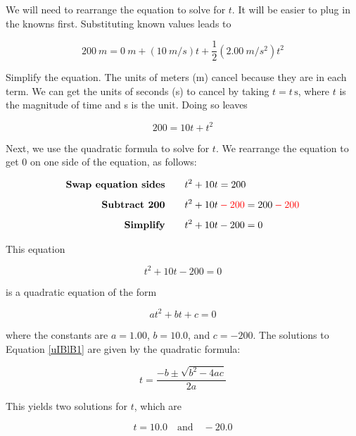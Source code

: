 \documentclass[main-ap-physics.tex]{subfiles}
\begin{document}
\vspace{1em}

We will need to rearrange the equation to solve for $t$. It will be easier to plug in the knowns first. Substituting known values leads to 

\begin{equation*}
    \SI{200}{m} = \SI{0}{m} + \left(\SI{10}{m/s}\right) t + \frac{1}{2}\left(\SI{2.00}{m/s^2}\right) t^2
\end{equation*}

Simplify the equation. The units of meters (m) cancel because they are in each term. We can get the units of seconds (s) to cancel by taking  $t = t\,\text{s}$, where $t$ is the magnitude of time and s is the unit. Doing so leaves

\begin{equation*}
    200 = 10t + t^2
\end{equation*}

Next, we use the quadratic formula to solve for $t$. We rearrange the equation to get 0 on one side of the equation, as follows:

\begin{align*}
    \textbf{Swap equation sides} \qquad & t^2 + 10t = 200\\[1ex]
    \textbf{Subtract 200} \qquad & t^2 + 10t \mathbin{\color{red} -} \textcolor{red}{200} = 200 \mathbin{\color{red} -} \textcolor{red}{200}\\[1ex]
    \textbf{Simplify} \qquad & t^2 + 10t - 200 = 0
\end{align*}

This equation

\begin{equation} \label{uIBlB1}
    t^2 + 10t - 200 = 0
\end{equation}

is a quadratic equation of the form

\begin{equation}
    a t^2 + bt + c = 0
\end{equation}

where the constants are $a = 1.00$, $b = 10.0$, and $c = -200$. The solutions to Equation \eqref{uIBlB1} are given by the quadratic formula:

\begin{equation}
    t = \frac{-b \pm \sqrt{b^2 - 4ac}}{2a}
\end{equation}

This yields two solutions for $t$, which are

\begin{equation*}
    t = 10.0 \quad \text{and} \quad -20.0
\end{equation*}
\end{document}
